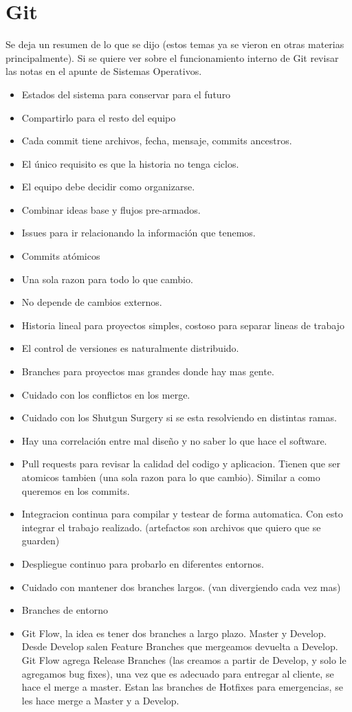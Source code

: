 \section{Git}
Se deja un resumen de lo que se dijo (estos temas ya se vieron en otras materias principalmente). Si se quiere ver sobre el funcionamiento interno de Git  revisar las notas en el apunte de Sistemas Operativos.

\begin{itemize}
\item Estados del sistema para conservar para el futuro
\item Compartirlo para el resto del equipo
\item Cada commit tiene archivos, fecha, mensaje, commits ancestros.
\item El único requisito es que la historia no tenga ciclos.
\item El equipo debe decidir como organizarse.
\item Combinar ideas base y flujos pre-armados.
\item Issues para ir relacionando la información que tenemos.
\item Commits atómicos
\item Una sola razon para todo lo que cambio.
\item No depende de cambios externos.
\item Historia lineal para proyectos simples, costoso para separar lineas de trabajo 
\item El control de versiones es naturalmente distribuido.
\item Branches para proyectos mas grandes donde hay mas gente.
\item Cuidado con los conflictos en los merge.
\item Cuidado con los Shutgun Surgery si se esta resolviendo en distintas ramas.
\item Hay una correlación entre mal diseño y no saber lo que hace el software.
\item Pull requests para revisar la calidad del codigo y aplicacion. Tienen que ser atomicos tambien (una sola razon para lo que cambio). Similar a como queremos en los commits.
\item Integracion continua para compilar y testear de forma automatica. Con esto integrar el trabajo realizado. (artefactos son archivos que quiero que se guarden)
\item Despliegue continuo para probarlo en diferentes entornos.
\item Cuidado con mantener dos branches largos. (van divergiendo cada vez mas)
\item Branches de entorno
\item Git Flow, la idea es tener dos branches a largo plazo. Master y Develop. Desde Develop salen Feature Branches que mergeamos devuelta a Develop. Git Flow agrega Release Branches (las creamos a partir de Develop, y solo le agregamos bug fixes), una vez que es adecuado para entregar al cliente, se hace el merge a master. Estan las branches de Hotfixes para emergencias, se les hace merge a Master y a Develop.
\end{itemize}


